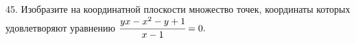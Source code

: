 45. Изобразите на координатной плоскости множество точек, координаты которых удовлетворяют уравнению $\cfrac{yx-x^2-y+1}{x-1}=0.$\\
